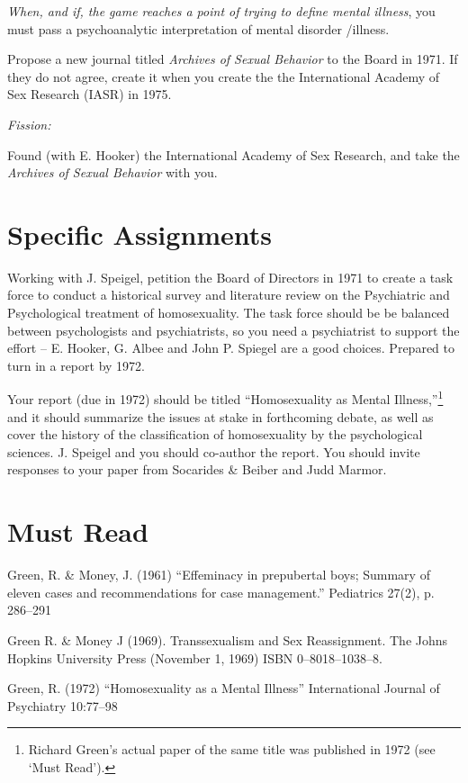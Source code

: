 \begin{refsection}
\emph{When, and if, the game reaches a point of trying to define mental illness}, you must pass a psychoanalytic interpretation of mental disorder \slash  illness.

Propose a new journal titled \emph{Archives of Sexual Behavior} to the Board in 1971. If they do not agree, create it when you create the the International Academy of Sex Research (IASR) in 1975.

\emph{Fission:}

Found (with E. Hooker) the International Academy of Sex Research, and take the \emph{Archives of Sexual Behavior} with you.

\section{Specific Assignments}
\label{specificassignments}

Working with J. Speigel, petition the Board of Directors in 1971 to create a task force to conduct a historical survey and literature review on the Psychiatric and Psychological treatment of homosexuality. The task force should be be balanced between psychologists and psychiatrists, so you need a psychiatrist to support the effort – E. Hooker, G. Albee and John P. Spiegel are a good choices. Prepared to turn in a report by 1972.

Your report (due in 1972) should be titled ``Homosexuality as Mental Illness,''\footnote{Richard Green's actual paper of the same title was published in 1972 (see `Must Read').} and it should summarize the issues at stake in forthcoming debate, as well as cover the history of the classification of homosexuality by the psychological sciences. J. Speigel and you should co-author the report. You should invite responses to your paper from Socarides \& Beiber and Judd Marmor.

\section{Must Read}
\label{mustread}

Green, R. \& Money, J. (1961) ``Effeminacy in prepubertal boys; Summary of eleven cases and recommendations for case management.'' Pediatrics 27(2), p. 286--291

Green R. \& Money J (1969). Transsexualism and Sex Reassignment. The Johns Hopkins University Press (November 1, 1969) ISBN 0--8018--1038--8.

Green, R. (1972) ``Homosexuality as a Mental Illness'' International Journal of Psychiatry 10:77--98


\end{refsection}
